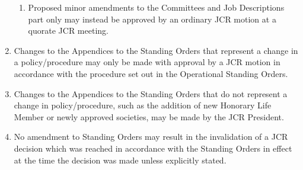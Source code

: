 \documentclass[12pt]{article}
\begin{document}
\begin{enumerate}
\begin{enumerate}
        \item Proposed minor amendments to the Committees and Job Descriptions part only may instead be approved by an ordinary JCR motion at a quorate JCR meeting.
    \end{enumerate}
    \item Changes to the Appendices to the Standing Orders that represent a change in a policy/procedure may only be made with approval by a JCR motion in accordance with the procedure set out in the Operational Standing Orders.
    \item Changes to the Appendices to the Standing Orders that do not represent a change in policy/procedure, such as the addition of new Honorary Life Member or newly approved societies, may be made by the JCR President.
    \item No amendment to Standing Orders may result in the invalidation of a JCR decision which was reached in accordance with the Standing Orders in effect at the time the decision was made unless explicitly stated.
\end{enumerate}
\newpage
\end{document}
